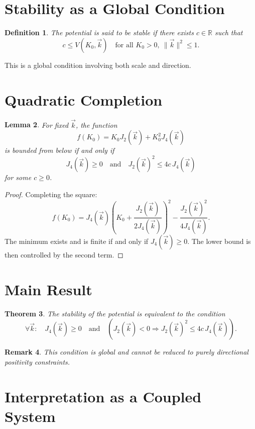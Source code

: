 \documentclass[11pt,a4paper]{article}
\newtheorem{definition}{Definition}[section]
\newtheorem{theorem}[definition]{Theorem}
\newtheorem{lemma}[definition]{Lemma}
\newtheorem{remark}[definition]{Remark}
\begin{document}
	\section{Stability as a Global Condition}
	
	\begin{definition}
		The potential is said to be stable if there exists $c \in \mathbb{R}$ such that
		\[
		c \leq V(K_0, \vec{k})
		\quad \text{for all } K_0 > 0, \ \|\vec{k}\|^2 \leq 1.
		\]
	\end{definition}
	
	This is a global condition involving both scale and direction.
	
	\section{Quadratic Completion}
	
	\begin{lemma}
		For fixed $\vec{k}$, the function
		\[
		f(K_0) = K_0 J_2(\vec{k}) + K_0^2 J_4(\vec{k})
		\]
		is bounded from below if and only if
		\[
		J_4(\vec{k}) \geq 0
		\quad \text{and} \quad
		J_2(\vec{k})^2 \leq 4c\,J_4(\vec{k})
		\]
		for some $c \geq 0$.
	\end{lemma}
	
	\begin{proof}
		Completing the square:
		\[
		f(K_0) = J_4(\vec{k})\left(K_0 + \frac{J_2(\vec{k})}{2J_4(\vec{k})}\right)^2 - \frac{J_2(\vec{k})^2}{4J_4(\vec{k})}.
		\]
		The minimum exists and is finite if and only if $J_4(\vec{k}) \geq 0$. The lower bound is then controlled by the second term.
	\end{proof}
	
	\section{Main Result}
	
	\begin{theorem}
		The stability of the potential is equivalent to the condition
		\[
		\forall \vec{k}:\quad J_4(\vec{k}) \geq 0
		\quad \text{and} \quad
		(J_2(\vec{k}) < 0 \Rightarrow J_2(\vec{k})^2 \leq 4c\,J_4(\vec{k})).
		\]
	\end{theorem}
	
	\begin{remark}
		This condition is global and cannot be reduced to purely directional positivity constraints.
	\end{remark}
	
	\section{Interpretation as a Coupled System}
	
\end{document}
